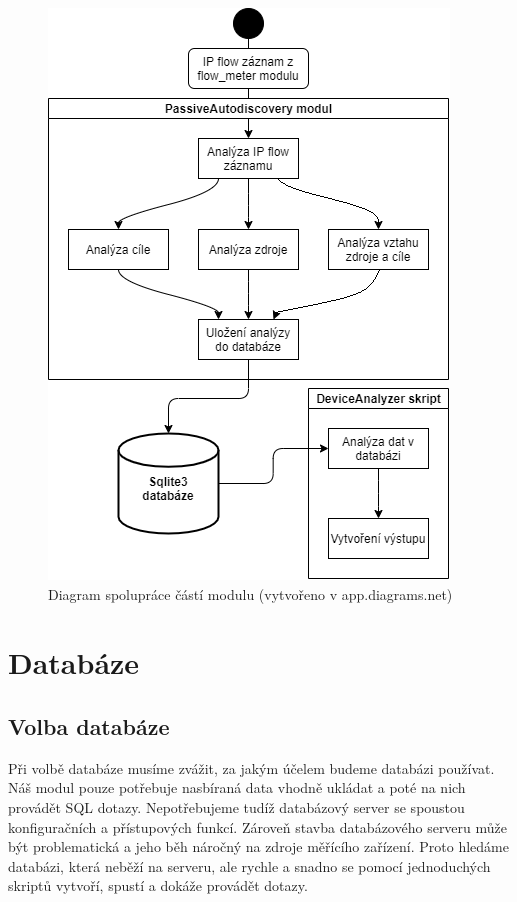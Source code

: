 \documentclass[thesis=B,czech,hidelinks]{FITthesis}[2019/03/21]
\begin{document}
    \begin{figure}
        \centering
        \includegraphics[width=\textwidth]{diagram.png}
        \caption[Diagram spolupráce částí modulu]{Diagram spolupráce částí modulu (vytvořeno v app.diagrams.net)}
        \label{Diagram}
    \end{figure}
    \newpage
    
    
    \section{Databáze}
        \subsection{Volba databáze}
        Při volbě databáze musíme zvážit, za jakým účelem budeme databázi používat. Náš modul pouze potřebuje nasbíraná data vhodně ukládat a poté na nich provádět SQL dotazy. Nepotřebujeme tudíž databázový server se spoustou konfiguračních a přístupových funkcí. Zároveň stavba databázového serveru může být problematická a jeho běh náročný na zdroje měřícího zařízení. Proto hledáme databázi, která neběží na serveru, ale rychle a snadno se pomocí jednoduchých skriptů vytvoří, spustí a dokáže provádět dotazy.
        
\end{document}
